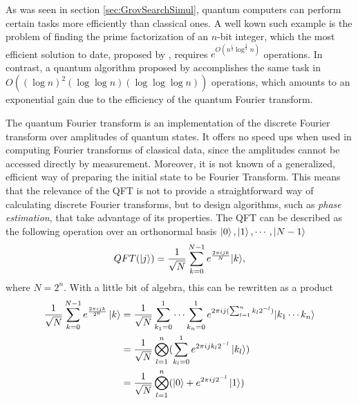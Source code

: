 \documentclass[../../../dissertation.tex]{subfiles}
\begin{document}
As was seen in section \ref{sec:GrovSearchSimul}, quantum computers can perform certain tasks more efficiently than classical ones. A well kown such example is the problem of finding the prime factorization of an $n$-bit integer, which the most efficient solution to date, proposed by \cite{Pollard93}, requires $e^{O(n^{\frac{1}{3}}\log^{\frac{2}{3}}n)}$ operations. In contrast, a quantum algorithm proposed by \cite{Shor94} accomplishes the same task in $O((\log n)^2 (\log \log n) (\log \log \log n))$ operations, which amounts to an exponential gain due to the efficiency of the quantum Fourier transform.\par

The quantum Fourier transform is an implementation of the discrete Fourier transform over amplitudes of quantum states. It offers no speed ups when used in computing Fourier transforms of classical data, since the amplitudes cannot be accessed directly by measurement. Moreover, it is not known of a generalized, efficient way of preparing the initial state to be Fourier Transform. This means that the relevance of the QFT is not to provide a straightforward way of calculating discrete Fourier transforms, but to design algorithms, such as \textit{phase estimation}, that take advantage of its properties. The QFT can be described as the following operation over an orthonormal basis $\ket{0}, \ket{1},\cdots,\ket{N-1}$
\begin{equation}
	QFT(\ket{j}) = \frac{1}{\sqrt{N}} \sum_{k=0}^{N-1} e^{\frac{2\pi i j k}{N}} {\ket{k}},
	\label{eq:qftGeneral}
\end{equation}
where $N = 2^n$. With a little bit of algebra, this can be rewritten as a product
\begin{equation}
	\begin{split}
		\frac{1}{\sqrt{N}} \sum_{k=0}^{N-1} e^{\frac{2\pi i j k}{2^n}} \ket{k} & = 
	\frac{1}{\sqrt{N}} \sum_{k_1=0}^1 \cdots \sum_{k_n=0}^{1} e^{2\pi i j (\sum_{l=1}^{n} k_l 2^{-l})} {\ket{k_1\cdots k_n}}  \\
																 &= \frac{1}{\sqrt{N}} \bigotimes_{l=1}^{n}( \sum_{k_l=0}^{1}  e^{2\pi i j k_l 2^{-l} } \ket{k_l} ) \\
																 &= \frac{1}{\sqrt{N}} \bigotimes_{l=1}^{n}( \ket{0} +  e^{2\pi i j 2^{-l} } \ket{1} )
	\end{split}
\end{equation}\par
\end{document}

